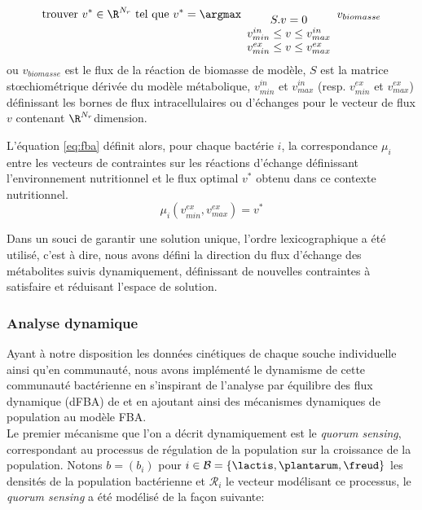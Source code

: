 \begin{equation}
\label{eq:fba}
\text{trouver }v^* \in \R^{N_r} \text{ tel que }  v^*= \argmax_{\begin{array}{c} S.v=0 \\ v_{min}^{in} \leq v \leq v_{max}^{in} \\ v_{min}^{ex} \leq v \leq v_{max}^{ex}   \end{array}}   v_{biomasse}
\end{equation}
ou $v_{biomasse}$ est le flux de la réaction de biomasse de modèle, $S$ est la matrice st\oe{}chiométrique dérivée du modèle métabolique, $v_{min}^{in}$ et $v_{max}^{in}$ (resp. $v_{min}^{ex}$ et $v_{max}^{ex}$) définissant les bornes de flux intracellulaires ou d'échanges pour le vecteur de flux $v$ contenant $\R^{N_r}$dimension. 

L'équation \eqref{eq:fba} définit alors, pour chaque bactérie $i$, la correspondance $\mu_{i}$ entre les vecteurs de contraintes sur les réactions d'échange définissant l'environnement nutritionnel et le flux optimal $v^*$ obtenu dans ce contexte nutritionnel.
\begin{equation}
\mu_{i}(v_{min}^{ex},v_{max}^{ex}) = v^*
\label{eq:mu-fba}
\end{equation}

Dans un souci de garantir une solution unique, l'ordre lexicographique \citep{gomez2014dfbalab} a été utilisé, c'est à dire, nous avons défini la direction du flux d'échange des métabolites suivis dynamiquement, définissant de nouvelles contraintes à satisfaire et réduisant l'espace de solution.

\subsubsection*{Analyse dynamique}
\label{dynamic analyse}

Ayant à notre disposition les données cinétiques de chaque souche individuelle ainsi qu'en communauté, nous avons implémenté le dynamisme de cette communauté bactérienne en s'inspirant de l'analyse par équilibre des flux dynamique (dFBA) de \citep{Mahadevan2002} et en ajoutant ainsi des mécanismes dynamiques de population au modèle FBA.\\

Le premier mécanisme que l'on a décrit dynamiquement est le \textit{quorum sensing}, correspondant au processus de régulation de la population sur la croissance de la population. Notons $b=(b_i)$ pour $i \in \mathcal{B}=\{\lactis,\plantarum,\freud\}$ les densités de la population bactérienne et $\mathcal{R}_{i}$ le vecteur modélisant ce processus, le \textit{quorum sensing} a été modélisé de la façon suivante:

